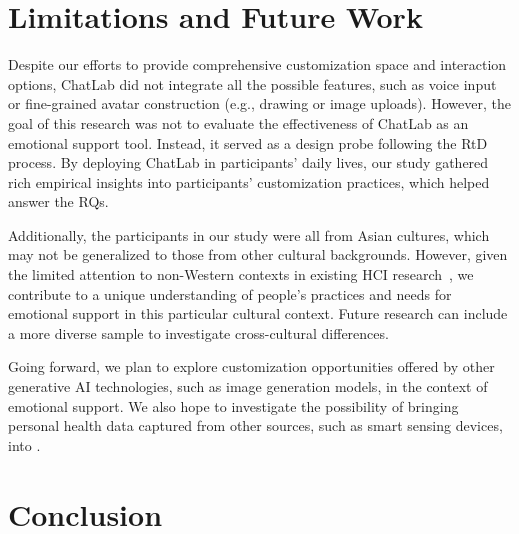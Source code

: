 \section{Limitations and Future Work}
Despite our efforts to provide comprehensive customization space and interaction options, ChatLab did not integrate all the possible features, such as voice input or fine-grained avatar construction (e.g., drawing or image uploads).
However, the goal of this research was not to evaluate the effectiveness of ChatLab as an emotional support tool. Instead, it served as a design probe following the RtD process. By deploying ChatLab in participants' daily lives, our study gathered rich empirical insights into participants' customization practices, which helped answer the RQs. 

Additionally, the participants in our study were all from Asian cultures, which may not be generalized to those from other cultural backgrounds. However, given the limited attention to non-Western contexts in existing HCI research~\cite{Linxen2021WeirdHCI}, we contribute to a unique understanding of people's practices and needs for emotional support in this particular cultural context. Future research can include a more diverse sample to investigate cross-cultural differences.

Going forward, we plan to explore customization opportunities offered by other generative AI technologies, such as image generation models, in the context of emotional support. We also hope to investigate the possibility of bringing personal health data captured from other sources, such as smart sensing devices, into .

\section{Conclusion}

